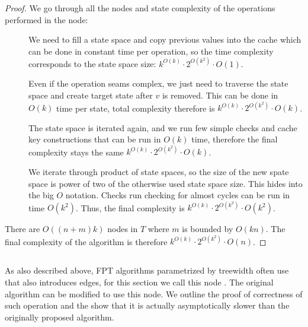 \begin{proof}
	We go through all the nodes and state complexity of the operations performed in the node:
	\begin{description}
		\item[\IntroduceVertexNode{}]
		      We need to fill a state space and copy previous values into the cache
		      which can be done in constant time per operation,
		      so the time complexity corresponds to the state space size:
		      \( {k}^{O(k)} \cdot 2^{O(k^2)} \cdot O(1) \).
		\item[\ForgetVertexNode{}]
		      Even if the operation seams complex, we just need to traverse the state space
		      and create target state after \( v \) is removed. This can be done in \( O(k) \) time
		      per state, total complexity therefore is
		      \( {k}^{O(k)} \cdot 2^{O(k^2)} \cdot O(k) \).
		\item[\IntroduceEdgeNode{}]
		      The state space is iterated again, and we run few simple checks and cache key constructions
		      that can be run in \( O(k) \) time, therefore the final complexity stays the same
		      \( {k}^{O(k)} \cdot 2^{O(k^2)} \cdot O(k) \).
		\item[\JoinNode{}]
		      We iterate through product of state spaces,
		      so the size of the new spate space is power of two
		      of the otherwise used state space size.
		      This hides into the big \( O \) notation.
		      Checks run checking for almost cycles can be run in time \( O(k^2) \).
		      Thus, the final		complexity is
		      \( {k}^{O(k)} \cdot 2^{O(k^2)} \cdot O(k^2) \).
	\end{description}

	There are \( O((n+m)k) \) nodes in \( T \) where \( m \) is bounded by \( O(kn) \).
	The final complexity of the algorithm is therefore
	\( {k}^{O(k)} \cdot 2^{O(k^2)} \cdot O(n) \).
\end{proof}
%

\subsection{\IntroduceVertexWithEdgesNode{}}

As also described above, FPT algorithms parametrized by treewidth
often use \IntroduceVertexNode{} that also introduces edges,
for this section we call this node \IntroduceVertexWithEdgesNode{}.
The original algorithm can be modified to use this node.
We outline the proof of correctness of such operation and the show
that it is actually asymptotically slower than the originally proposed algorithm.


